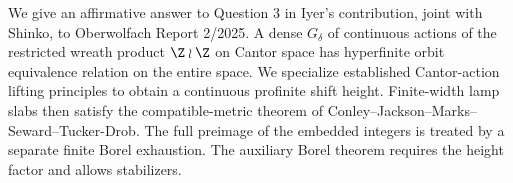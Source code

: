 We give an affirmative answer to Question 3 in Iyer's contribution, joint with
Shinko, to Oberwolfach Report 2/2025. A dense $G_\delta$ of continuous actions
of the restricted wreath product $\Z\wr\Z$ on Cantor space has hyperfinite
orbit equivalence relation on the entire space. We specialize established
Cantor-action lifting principles to obtain a continuous profinite shift height.
Finite-width lamp slabs then satisfy the compatible-metric theorem of
Conley--Jackson--Marks--Seward--Tucker-Drob. The full preimage of the embedded
integers is treated by a separate finite Borel exhaustion. The auxiliary Borel
theorem requires the height factor and allows stabilizers.
